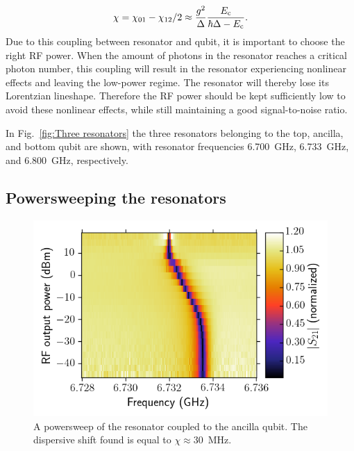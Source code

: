         \begin{equation}
          \chi = \chi_{01} - \chi_{12}/2 \approx \frac{g^2}{\Delta}\frac{E_\text{c}}{\hbar \Delta - E_\text{c}}.
          \label{eq:dispersive-shift}
        \end{equation}
        Due to this coupling between resonator and qubit, it is important to choose the right RF power. When the amount of photons in the resonator reaches a critical photon number, this coupling will result in the resonator experiencing nonlinear effects and leaving the low-power regime. The resonator will thereby lose its Lorentzian lineshape. Therefore the RF power should be kept sufficiently low to avoid these nonlinear effects, while still maintaining a good signal-to-noise ratio.

        In Fig.~\ref{fig:Three resonators} the three resonators belonging to the top, ancilla, and bottom qubit are shown, with resonator frequencies \SI{6.700}{\giga \hertz}, \SI{6.733}{\giga \hertz}, and \SI{6.800}{\giga \hertz}, respectively.


      \subsection{Powersweeping the resonators}
        \label{ssec:powersweep}

        \begin{figure}
          \begin{center}
          \vspace{-30pt}
            \includegraphics[width=\textwidth]{Figures/Qubit characterization/Powersweep.png}
          \end{center}
          \vspace{-20 pt}
          \caption{A powersweep of the resonator coupled to the ancilla qubit. The dispersive shift found is equal to $\chi\approx$\SI{30}{\mega \hertz}.}
          \label{fig:powersweep}
        \end{figure}

